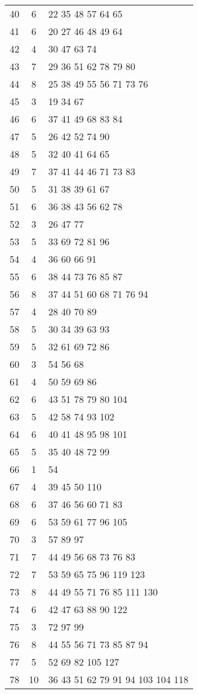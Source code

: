 \documentclass{standalone}
\begin{document}
\begin{tabular}{c c l}
40 & 6 & 22 35 48 57 64 65 \\
41 & 6 & 20 27 46 48 49 64 \\
42 & 4 & 30 47 63 74 \\
43 & 7 & 29 36 51 62 78 79 80 \\
44 & 8 & 25 38 49 55 56 71 73 76 \\
45 & 3 & 19 34 67 \\
46 & 6 & 37 41 49 68 83 84 \\
47 & 5 & 26 42 52 74 90 \\
48 & 5 & 32 40 41 64 65 \\
49 & 7 & 37 41 44 46 71 73 83 \\
50 & 5 & 31 38 39 61 67 \\
51 & 6 & 36 38 43 56 62 78 \\
52 & 3 & 26 47 77 \\
53 & 5 & 33 69 72 81 96 \\
54 & 4 & 36 60 66 91 \\
55 & 6 & 38 44 73 76 85 87 \\
56 & 8 & 37 44 51 60 68 71 76 94 \\
57 & 4 & 28 40 70 89 \\
58 & 5 & 30 34 39 63 93 \\
59 & 5 & 32 61 69 72 86 \\
60 & 3 & 54 56 68 \\
61 & 4 & 50 59 69 86 \\
62 & 6 & 43 51 78 79 80 104 \\
63 & 5 & 42 58 74 93 102 \\
64 & 6 & 40 41 48 95 98 101 \\
65 & 5 & 35 40 48 72 99 \\
66 & 1 & 54 \\
67 & 4 & 39 45 50 110 \\
68 & 6 & 37 46 56 60 71 83 \\
69 & 6 & 53 59 61 77 96 105 \\
70 & 3 & 57 89 97 \\
71 & 7 & 44 49 56 68 73 76 83 \\
72 & 7 & 53 59 65 75 96 119 123 \\
73 & 8 & 44 49 55 71 76 85 111 130 \\
74 & 6 & 42 47 63 88 90 122 \\
75 & 3 & 72 97 99 \\
76 & 8 & 44 55 56 71 73 85 87 94 \\
77 & 5 & 52 69 82 105 127 \\
78 & 10 & 36 43 51 62 79 91 94 103 104 118 \\

\end{tabular}
\end{document}
